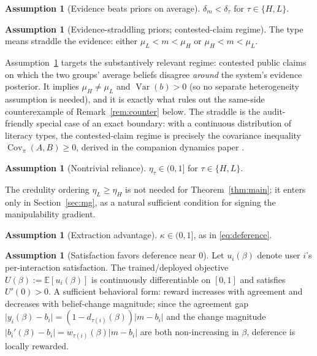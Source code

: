 \documentclass[11pt]{article}
\theoremstyle{definition}
\newtheorem{assumption}[theorem]{Assumption}
\theoremstyle{remark}
\numberwithin{equation}{section}
\DeclareMathOperator{\Var}{Var}
\DeclareMathOperator{\Cov}{Cov}
\newcommand{\E}{\mathbb{E}}
\begin{document}
\begin{assumption}[Evidence beats priors on average]\label{ass:evidence}
$\delta_m < \delta_\tau$ for $\tau \in \{H, L\}$.
\end{assumption}

\begin{assumption}[Evidence-straddling priors; contested-claim regime]\label{ass:straddle}
The type means straddle the evidence: either $\mu_L < m < \mu_H$ or $\mu_H < m < \mu_L$.
\end{assumption}

Assumption~\ref{ass:straddle} targets the substantively relevant regime: contested public claims on which the two groups' average beliefs disagree \emph{around} the system's evidence posterior. It implies $\mu_H \neq \mu_L$ and $\Var(b) > 0$ (so no separate heterogeneity assumption is needed), and it is exactly what rules out the same-side counterexample of Remark~\ref{rem:counter} below. The straddle is the audit-friendly special case of an exact boundary: with a continuous distribution of literacy types, the contested-claim regime is precisely the covariance inequality $\Cov_\pi(A,B) \ge 0$, derived in the companion dynamics paper \citep{hofheinz2026drift}.

\begin{assumption}[Nontrivial reliance]\label{ass:reliance}
$\eta_\tau \in (0,1]$ for $\tau \in \{H, L\}$.
\end{assumption}

The credulity ordering $\eta_L \ge \eta_H$ is not needed for Theorem~\ref{thm:main}; it enters only in Section~\ref{sec:mg}, as a natural sufficient condition for signing the manipulability gradient.

\begin{assumption}[Extraction advantage]\label{ass:extraction}
$\kappa \in (0,1]$, as in \eqref{eq:deference}.
\end{assumption}

\begin{assumption}[Satisfaction favors deference near $0$]\label{ass:satisfaction}
Let $u_i(\beta)$ denote user $i$'s per-interaction satisfaction. The trained/deployed objective $U(\beta) := \E[u_i(\beta)]$ is continuously differentiable on $[0,1]$ and satisfies $U'(0) > 0$. A sufficient behavioral form: reward increases with agreement and decreases with belief-change magnitude; since the agreement gap $\lvert y_i(\beta) - b_i\rvert = (1-d_{\tau(i)}(\beta))\lvert m - b_i\rvert$ and the change magnitude $\lvert b_i'(\beta) - b_i\rvert = w_{\tau(i)}(\beta)\lvert m - b_i\rvert$ are both non-increasing in $\beta$, deference is locally rewarded.
\end{assumption}
\end{document}
